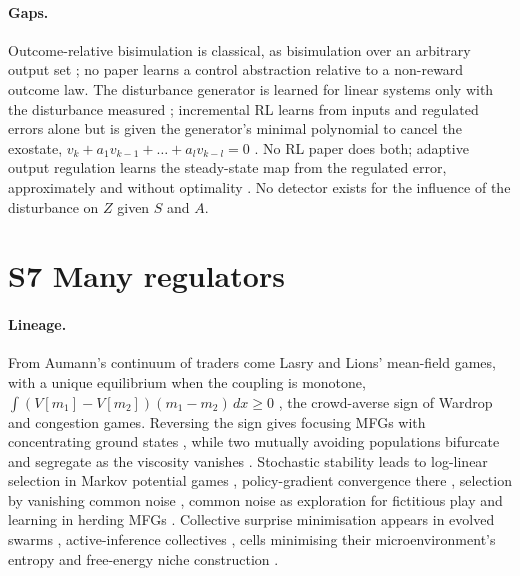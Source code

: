 \documentclass[10pt]{article}
\begin{document}
\paragraph{Gaps.}
Outcome-relative bisimulation is classical, as bisimulation over an arbitrary output set \citep{Larsen-bisimulation91,Givan-equivalence03}; no paper learns a control abstraction relative to a non-reward outcome law. The disturbance generator is learned for linear systems only with the disturbance measured \citep{Qasem-adaptive22}; incremental RL learns from inputs and regulated errors alone but is given the generator's minimal polynomial to cancel the exostate, $v_k+a_1v_{k-1}+\dots+a_lv_{k-l}=0$ \citep{Zhao-incremental24,Jing-incremental25}. No RL paper does both; adaptive output regulation learns the steady-state map from the regulated error, approximately and without optimality \citep{Bin-internal22}. No detector exists for the influence of the disturbance on $Z$ given $S$ and $A$.

\section{S7 Many regulators}

\paragraph{Lineage.}
From Aumann's continuum of traders come Lasry and Lions' mean-field games, with a unique equilibrium when the coupling is monotone, $\int(V[m_1]-V[m_2])(m_1-m_2)\,dx\ge0$ \citep[Thm.~2.4]{Lasry-mean07}, the crowd-averse sign of Wardrop and congestion games. Reversing the sign gives focusing MFGs with concentrating ground states \citep{Cesaroni-concentration19}, while two mutually avoiding populations bifurcate and segregate as the viscosity vanishes \citep{Cirant-bifurcation17}. Stochastic stability \citep{Kandori-learning93} leads to log-linear selection in Markov potential games \citep{Zhang-equilibrium24}, policy-gradient convergence there \citep{Leonardos-global21}, selection by vanishing common noise \citep{Cecchin-selection21}, common noise as exploration for fictitious play \citep{Delarue-exploration21} and learning in herding MFGs \citep{Zeng-learning24}. Collective surprise minimisation appears in evolved swarms \citep{Kaiser-innate22}, active-inference collectives \citep{Heins-collective24}, cells minimising their microenvironment's entropy \citep{Barua-entropydriven20} and free-energy niche construction \citep{Bruineberg-free18}.
\end{document}
